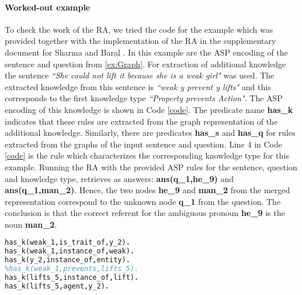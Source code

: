 \paragraph{Worked-out example} To check the work of the RA, we tried the code for the example which was provided together with the implementation of the RA in the supplementary document for Sharma and Baral \cite{2018CommonsenseKT}. In this example are the ASP encoding of the sentence and question from \ref{ex:Graph}.
For extraction of additional knowledge the sentence \textit{``She could not lift it because she is a weak girl"} was used. The extracted knowledge from this sentence is \textit{``weak y prevent y lifts"} and this corresponds to the first knowledge type \textit{``Property prevents Action"}. The ASP encoding of this knowledge is shown in Code \ref{code}. The predicate name \textbf{has\_k} indicates that these rules are extracted from the graph representation of the additional knowledge. Similarly, there are predicates \textbf{has\_s} and \textbf{has\_q} for rules extracted from the graphs of the input sentence and question. Line 4 in Code \ref{code} is the rule which characterizes the corresponding knowledge type for this example. Running the RA with the provided ASP rules for the sentence, question and knowledge type, retrieves as answers: \textbf{ans(q\_1,he\_9)} and \textbf{ans(q\_1,man\_2)}. Hence, the two nodes \textbf{he\_9} and \textbf{man\_2} from the merged representation correspond to the unknown node \textbf{q\_1} from the question. The conclusion is that the correct referent for the ambiguous pronoun \textbf{he\_9} is the noun \textbf{man\_2}. 


\begin{lstlisting}[language = Prolog, style=SC, caption={``weak y prevents y lifts"},label=code ]
has_k(weak_1,is_trait_of,y_2).
has_k(weak_1,instance_of,weak).
has_k(y_2,instance_of,entity).
%has_k(weak_1,prevents,lifts_5).
has_k(lifts_5,instance_of,lift).
has_k(lifts_5,agent,y_2).
\end{lstlisting}


